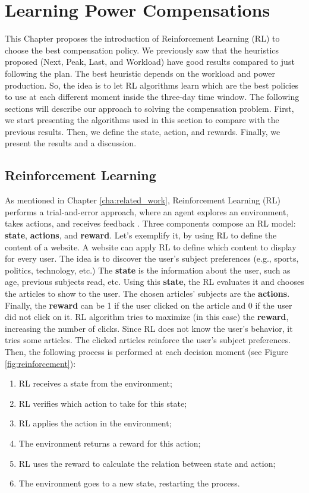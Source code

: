 \chapter{Learning Power Compensations}
\label{cha:learning_power_compensations}

\minitoc

This Chapter proposes the introduction of Reinforcement Learning (RL) to choose the best compensation policy. We previously saw that the heuristics proposed (Next, Peak, Last, and Workload) have good results compared to just following the plan. The best heuristic depends on the workload and power production. So, the idea is to let RL algorithms learn which are the best policies to use at each different moment inside the three-day time window. The following sections will describe our approach to solving the compensation problem. First, we start presenting the algorithms used in this section to compare with the previous results. Then, we define the state, action, and rewards. Finally, we present the results and a discussion.

\section{Reinforcement Learning}

As mentioned in Chapter \ref{cha:related_work}, Reinforcement Learning (RL) performs a trial-and-error approach, where an agent explores an environment, takes actions, and receives feedback \cite{kaelbling1996reinforcement}. Three components compose an RL model: \textbf{state}, \textbf{actions}, and \textbf{reward}. Let's exemplify it, by using RL to define the content of a website. A website can apply RL to define which content to display for every user. The idea is to discover the user's subject preferences (e.g., sports, politics, technology, etc.) The \textbf{state} is the information about the user, such as age, previous subjects read, etc. Using this \textbf{state}, the RL evaluates it and chooses the articles to show to the user. The chosen articles' subjects are the \textbf{actions}. Finally, the \textbf{reward} can be 1 if the user clicked on the article and 0 if the user did not click on it. RL algorithm tries to maximize (in this case) the \textbf{reward}, increasing the number of clicks. Since RL does not know the user's behavior, it tries some articles. The clicked articles reinforce the user's subject preferences. Then, the following process is performed at each decision moment (see Figure \ref{fig:reinforcement}):
\begin{enumerate}
    \item RL receives a state from the environment;
    \item RL verifies which action to take for this state;
    \item RL applies the action in the environment;
    \item The environment returns a reward for this action;
    \item RL uses the reward to calculate the relation between state and action;
    \item The environment goes to a new state, restarting the process.
\end{enumerate}

